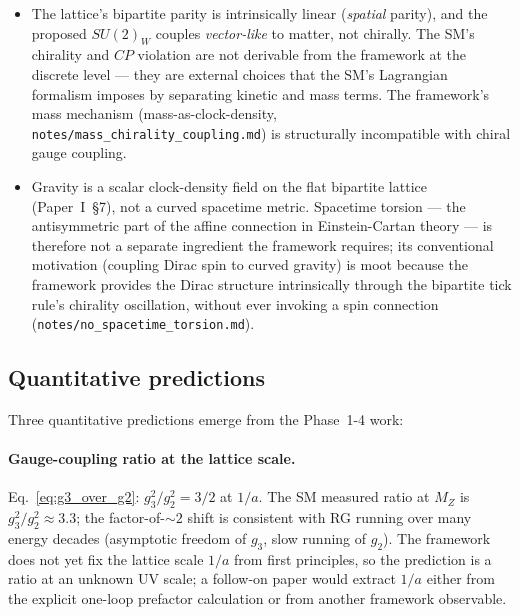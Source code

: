 \begin{itemize}
\item The lattice's bipartite parity is intrinsically linear
(\emph{spatial} parity), and the proposed $SU(2)_W$ couples
\emph{vector-like} to matter, not chirally.  The SM's chirality
and $CP$ violation are not derivable from the framework at the
discrete level --- they are external choices that the SM's
Lagrangian formalism imposes by separating kinetic and mass terms.
The framework's mass mechanism (mass-as-clock-density,
\nolinkurl{notes/mass_chirality_coupling.md}) is structurally
incompatible with chiral gauge coupling.

\item Gravity is a scalar clock-density field on the flat
bipartite lattice (Paper~I~§7), not a curved spacetime metric.
Spacetime torsion --- the antisymmetric part of the affine
connection in Einstein-Cartan theory --- is therefore not a
separate ingredient the framework requires; its conventional
motivation (coupling Dirac spin to curved gravity) is moot
because the framework provides the Dirac structure intrinsically
through the bipartite tick rule's chirality oscillation, without
ever invoking a spin connection (\nolinkurl{notes/no_spacetime_torsion.md}).
\end{itemize}

\subsection{Quantitative predictions}
\label{subsec:quantitative_predictions}

Three quantitative predictions emerge from the Phase~1-4 work:

\paragraph{Gauge-coupling ratio at the lattice scale.}
Eq.~\eqref{eq:g3_over_g2}: $g_3^2 / g_2^2 = 3/2$ at $1/a$.  The SM
measured ratio at $M_Z$ is $g_3^2/g_2^2 \approx 3.3$; the
factor-of-$\sim 2$ shift is consistent with RG running over many
energy decades (asymptotic freedom of $g_3$, slow running of
$g_2$).  The framework does not yet fix the lattice scale $1/a$ from
first principles, so the prediction is a ratio at an unknown UV
scale; a follow-on paper would extract $1/a$ either from the
explicit one-loop prefactor calculation or from another framework
observable.

